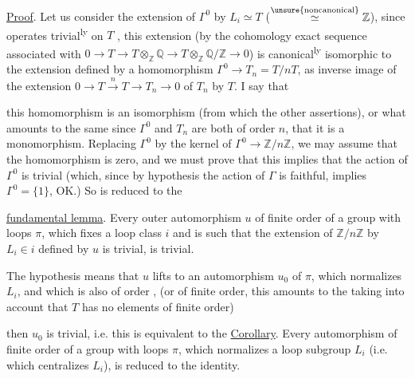 \uline{Proof}. Let us consider the extension
 of $\Gamma^0$ by $L_i\simeq T$ ($\overset{\text{\unsure{noncanonical}}}{\simeq}\mathbb Z$),
since  operates trivial\textsuperscript{ly} on $T$ , this
extension (by the cohomology exact sequence
associated with $0\to T\to T\otimes_{\mathbb Z}\mathbb Q\to T\otimes_{\mathbb Z}\mathbb Q/\mathbb Z\to0$)
is canonical\textsuperscript{ly} isomorphic to  the extension
defined by a homomorphism $\Gamma^0\to T_n=T/nT$,
as inverse image of the extension
$0\to T\xrightarrow{n}T\to T_n\to0$ of $T_n$ by $T$. I say that


this homomorphism is an isomorphism (from which 
the other assertions), or what amounts
to the same since $\Gamma^0$ and $T_n$ are both
of order $n$, that it is a monomorphism.
Replacing $\Gamma^0$ by the kernel of $\Gamma^0\to\mathbb Z/n\mathbb Z$,
we may assume that the homomorphism  is zero, and we must
prove that this implies that the action
of $\Gamma^0$ is trivial (which, since by hypothesis
the action of $\Gamma$ is faithful, implies $\Gamma^0=\{1\}$,
OK.) So  is reduced to the

\uline{fundamental lemma}. Every  outer automorphism
$u$ of finite order  of a group with
loops $\pi$, which fixes a loop class
$i$ and is such that the extension of $\mathbb Z/n\mathbb Z$
by $L_i\in i$ defined by $u$ is trivial,
is trivial.

The hypothesis means that $u$ lifts
to an automorphism $u_0$ of $\pi$, which
normalizes $L_i$, and which is also of order ,
(or of finite order, this amounts to the  taking into account
that  $T$ has no elements of finite order)


then $u_0$ is trivial, i.e. this is equivalent to the
\uline{Corollary}. Every  automorphism of finite order  of
a group with loops $\pi$,  which normalizes
a loop subgroup $L_i$ (i.e. which
centralizes $L_i$), is reduced to the identity.

